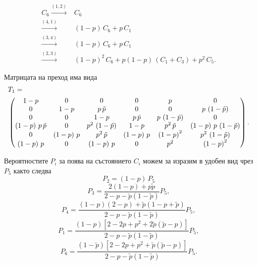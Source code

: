 \documentclass[a4paper,10pt]{article}
\begin{document}
%
\begin{equation}
\begin{split}
C_6 \xrightarrow{(1,2)}& C_6\\
    \xrightarrow{(4,1)}& (1-p)\,C_6 + p\,C_1\\
    \xrightarrow{(3,4)}& (1-p)\,C_6 + p\,C_1\\
    \xrightarrow{(2,3)}& (1-p)^2\,C_6 + p(1-p)\,(C_1 + C_3) + p^2\,C_5.
\end{split}
\end{equation}

Матрицата на преход има вида
{\small
\begin{equation}
\begin{split}
&T_{1} = \\
&\begin{pmatrix}
 1-p & 0 & 0 & 0 & p & 0\cr
 0 & 1-p & p\,\tilde{p} & 0 & 0 & p\,\left( 1-\tilde{p}\right) \cr
 0 & 0 & 1-p & p\,\tilde{p} & p\,\left( 1-\tilde{p}\right)  & 0\cr
 \left( 1-p\right) \,p\,\tilde{p} & 0 & {p}^{2}\,\left( 1-\tilde{p}\right)  & 1-p & {p}^{2}\,\tilde{p} & \left( 1-p\right) \,p\,\left( 1-\tilde{p}\right) \cr
 0 & \left( 1-p\right) \,p & {p}^{2}\,\tilde{p} & \left( 1-p\right) \,p & {\left( 1-p\right) }^{2} & {p}^{2}\,\left( 1-\tilde{p}\right) \cr
 \left( 1-p\right) \,p & 0 & \left( 1-p\right) \,p & 0 & {p}^{2} & {\left( 1-p\right) }^{2}
\end{pmatrix}.
\end{split}
\end{equation}
}

Вероятностите $P_i$ за поява на състоянието $C_i$ можем за изразим в удобен вид чрез $P_5$
както следва
\begin{equation}
 P_2 = (1-p)\,P_5
\end{equation}
\begin{equation}
 P_3 = \frac{2(1-p) + p\tilde{p}}{2-p-\tilde{p}(1-\tilde{p})} P_5,
\end{equation}
\begin{equation}
 P_4 = \frac{(1-p)(2-p)+\tilde{p}(1-p+\tilde{p})}{2-p-\tilde{p}(1-\tilde{p})} P_5,
\end{equation}
\begin{equation}
 P_1 = \frac{(1-p)[2-2p+p^2+2\tilde{p}(\tilde{p}-p)]}{2-p-\tilde{p}(1-\tilde{p})} P_5,
\end{equation}
\begin{equation}
 P_6 = \frac{(1-\tilde{p})[2-2p+p^2+\tilde{p}(\tilde{p}-p)]}{2-p-\tilde{p}(1-\tilde{p})} P_5.
\end{equation}
\end{document}
